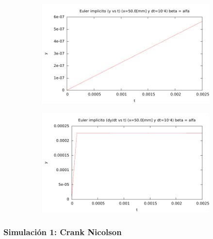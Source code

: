 \begin{center}
\begin{figure} [H]
	\begin{subfigure}[b]{0.3\textwidth}
		\includegraphics{./parte3/graficos/grafico_euler_S1_y_b2.pdf}
		\caption{} 
		\label{fig:eulerS1b2_y}
	\end{subfigure}
	
	\begin{subfigure}[b]{0.3\textwidth}
		\includegraphics{./parte3/graficos/grafico_euler_S1_dy_b2.pdf}
		\caption{} 
		\label{fig:eulerS1b2_dy}
	\end{subfigure}
\caption{} \label{euler_S1_b2}
\end{figure}
\end{center}


\subsubsection{Simulación 1: Crank Nicolson}

